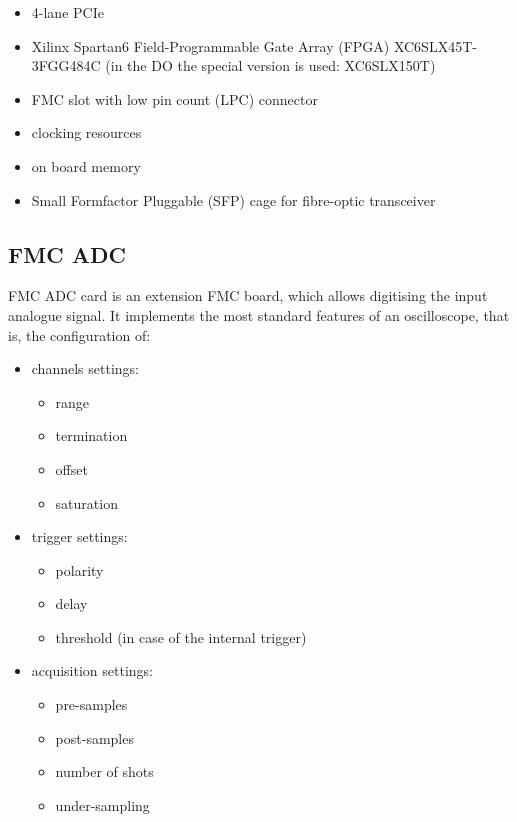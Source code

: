         \begin{itemize}
            \item 4-lane PCIe
            \item Xilinx Spartan6 Field-Programmable Gate Array (FPGA) XC6SLX45T-3FGG484C (in the DO the special version is used: XC6SLX150T)
            \item FMC slot with low pin count (LPC) connector
            \item clocking resources
            \item on board memory
            \item Small Formfactor Pluggable (SFP) cage for fibre-optic transceiver
        \end{itemize}
    
    \subsection{FMC ADC} \label{section:fmc_adc}
        FMC ADC card \cite{fmc_adc_ohwr} is an extension FMC board, which allows digitising the input analogue signal. 
        It implements the most standard features of an oscilloscope, that is, the configuration of:
        \begin{itemize}
            \item channels settings:
            \begin{itemize}
                \item range
                \item termination
                \item offset
                \item saturation
            \end{itemize}
            \item trigger settings:
            \begin{itemize}
                \item polarity
                \item delay
                \item threshold (in case of the internal trigger)
            \end{itemize}
            \item acquisition settings:
            \begin{itemize}
                \item pre-samples
                \item post-samples
                \item number of shots
                \item under-sampling
            \end{itemize}
        \end{itemize}
        
